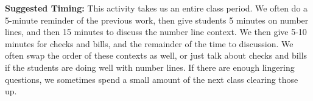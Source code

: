 \documentclass{ximera}
\begin{document}
\begin{instructorNotes}
{\bf Suggested Timing:} This activity takes us an entire class period.  We often do a 5-minute reminder of the previous work, then give students 5 minutes on number lines, and then 15 minutes to discuss the number line context.  We then give 5-10 minutes for checks and bills, and the remainder of the time to discussion.  We often swap the order of these contexts as well, or just talk about checks and bills if the students are doing well with number lines.  If there are enough lingering questions, we sometimes spend a small amount of the next class clearing those up.
\end{instructorNotes}
\end{document}
